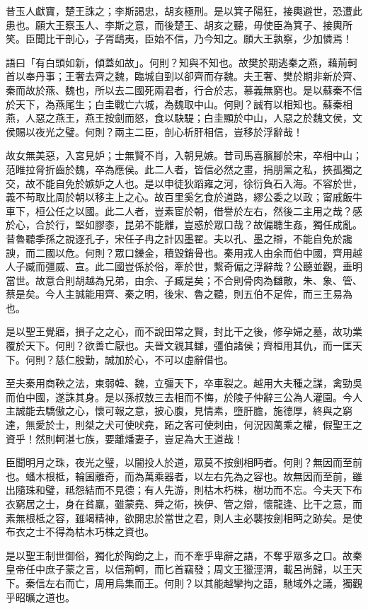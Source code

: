 \begin{pinyinscope}
昔玉人獻寶，楚王誅之；李斯謁忠，胡亥極刑。是以箕子陽狂，接輿避世，恐遭此患也。願大王察玉人、李斯之意，而後楚王、胡亥之聽，毋使臣為箕子、接輿所笑。臣聞比干剖心，子胥鴟夷，臣始不信，乃今知之。願大王孰察，少加憐焉！

語曰「有白頭如新，傾蓋如故」。何則？知與不知也。故樊於期逃秦之燕，藉荊軻首以奉丹事；王奢去齊之魏，臨城自剄以卻齊而存魏。夫王奢、樊於期非新於齊、秦而故於燕、魏也，所以去二國死兩君者，行合於志，慕義無窮也。是以蘇秦不信於天下，為燕尾生；白圭戰亡六城，為魏取中山。何則？誠有以相知也。蘇秦相燕，人惡之燕王，燕王按劍而怒，食以駃騠；白圭顯於中山，人惡之於魏文侯，文侯賜以夜光之璧。何則？兩主二臣，剖心析肝相信，豈移於浮辭哉！

故女無美惡，入宮見妒；士無賢不肖，入朝見嫉。昔司馬喜臏腳於宋，卒相中山；范睢拉脅折齒於魏，卒為應侯。此二人者，皆信必然之畫，捐朋黨之私，挾孤獨之交，故不能自免於嫉妒之人也。是以申徒狄蹈雍之河，徐衍負石入海。不容於世，義不苟取比周於朝以移主上之心。故百里奚乞食於道路，繆公委之以政；甯戚飯牛車下，桓公任之以國。此二人者，豈素宦於朝，借譽於左右，然後二主用之哉？感於心，合於行，堅如膠桼，昆弟不能離，豈惑於眾口哉？故偏聽生姦，獨任成亂。昔魯聽季孫之說逐孔子，宋任子冉之計囚墨翟。夫以孔、墨之辯，不能自免於讒諛，而二國以危。何則？眾口鑠金，積毀銷骨也。秦用戎人由余而伯中國，齊用越人子臧而彊威、宣。此二國豈係於俗，牽於世，繫奇偏之浮辭哉？公聽並觀，垂明當世。故意合則胡越為兄弟，由余、子臧是矣；不合則骨肉為讎敵，朱、象、管、蔡是矣。今人主誠能用齊、秦之明，後宋、魯之聽，則五伯不足侔，而三王易為也。

是以聖王覺寤，損子之之心，而不說田常之賢，封比干之後，修孕婦之墓，故功業覆於天下。何則？欲善亡厭也。夫晉文親其讎，彊伯諸侯；齊桓用其仇，而一匡天下。何則？慈仁殷勤，誠加於心，不可以虛辭借也。

至夫秦用商鞅之法，東弱韓、魏，立彊天下，卒車裂之。越用大夫種之謀，禽勁吳而伯中國，遂誅其身。是以孫叔敖三去相而不悔，於陵子仲辭三公為人灌園。今人主誠能去驕傲之心，懷可報之意，披心腹，見情素，墮肝膽，施德厚，終與之窮達，無愛於士，則桀之犬可使吠堯，跖之客可使刺由，何況因萬乘之權，假聖王之資乎！然則軻湛七族，要離燔妻子，豈足為大王道哉！

臣聞明月之珠，夜光之璧，以闇投人於道，眾莫不按劍相眄者。何則？無因而至前也。蟠木根柢，輪囷離奇，而為萬乘器者，以左右先為之容也。故無因而至前，雖出隨珠和璧，祗怨結而不見德；有人先游，則枯木朽株，樹功而不忘。今夫天下布衣窮居之士，身在貧羸，雖蒙堯、舜之術，挾伊、管之辯，懷龍逢、比干之意，而素無根柢之容，雖竭精神，欲開忠於當世之君，則人主必襲按劍相眄之跡矣。是使布衣之士不得為枯木巧株之資也。

是以聖王制世御俗，獨化於陶鈞之上，而不牽乎卑辭之語，不奪乎眾多之口。故秦皇帝任中庶子蒙之言，以信荊軻，而匕首竊發；周文王獵涇渭，載呂尚歸，以王天下。秦信左右而亡，周用烏集而王。何則？以其能越攣拘之語，馳域外之議，獨觀乎昭曠之道也。


\end{pinyinscope}
